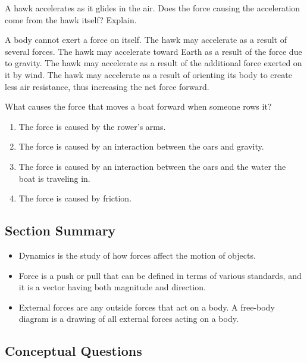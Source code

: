 \documentclass[
]{book}
\providecommand{\tightlist}{%
  \setlength{\itemsep}{0pt}\setlength{\parskip}{0pt}}
\begin{document}
\hypertarget{fs-id1470278}{}
\leavevmode{}%
A hawk accelerates as it glides in the air. Does the force causing the
acceleration come from the hawk itself? Explain.

\leavevmode{}%
A body cannot exert a force on itself. The hawk may accelerate as a
result of several forces. The hawk may accelerate toward Earth as a
result of the force due to gravity. The hawk may accelerate as a result
of the additional force exerted on it by wind. The hawk may accelerate
as a result of orienting its body to create less air resistance, thus
increasing the net force forward.

\hypertarget{fs-id1418886}{}
\leavevmode{}%
What causes the force that moves a boat forward when someone rows it?

\begin{enumerate}
\def\labelenumi{\alph{enumi}.}
\tightlist
\item
  The force is caused by the rower's arms.
\item
  The force is caused by an interaction between the oars and gravity.
\item
  The force is caused by an interaction between the oars and the water
  the boat is traveling in.
\item
  The force is caused by friction.
\end{enumerate}

\hypertarget{fs-id1772190-summary}{}
\hypertarget{section-summary-8}{%
\subsection{Section Summary}\label{section-summary-8}}

\begin{itemize}
\tightlist
\item
  {Dynamics} is the study of how forces affect the
  motion of objects.
\item
  {Force} is a push or pull that can be defined in
  terms of various standards, and it is a vector having both magnitude
  and direction.
\item
  {External forces} are any outside forces that act
  on a body. A {free-body diagram} is a drawing of
  all external forces acting on a body.
\end{itemize}

\hypertarget{fs-id1477045}{}
\hypertarget{conceptual-questions-11}{%
\subsection{Conceptual Questions}\label{conceptual-questions-11}}
\end{document}
